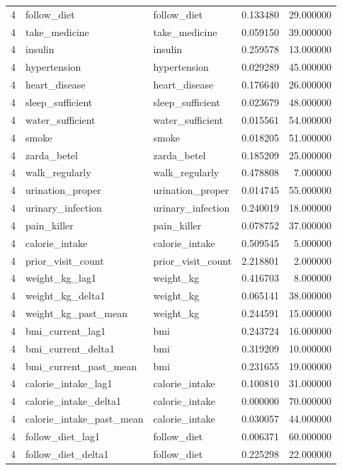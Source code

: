 \begin{longtable}{rllrr}
4 & follow\_diet & follow\_diet & 0.133480 & 29.000000 \\
4 & take\_medicine & take\_medicine & 0.059150 & 39.000000 \\
4 & insulin & insulin & 0.259578 & 13.000000 \\
4 & hypertension & hypertension & 0.029289 & 45.000000 \\
4 & heart\_disease & heart\_disease & 0.176640 & 26.000000 \\
4 & sleep\_sufficient & sleep\_sufficient & 0.023679 & 48.000000 \\
4 & water\_sufficient & water\_sufficient & 0.015561 & 54.000000 \\
4 & smoke & smoke & 0.018205 & 51.000000 \\
4 & zarda\_betel & zarda\_betel & 0.185209 & 25.000000 \\
4 & walk\_regularly & walk\_regularly & 0.478808 & 7.000000 \\
4 & urination\_proper & urination\_proper & 0.014745 & 55.000000 \\
4 & urinary\_infection & urinary\_infection & 0.240019 & 18.000000 \\
4 & pain\_killer & pain\_killer & 0.078752 & 37.000000 \\
4 & calorie\_intake & calorie\_intake & 0.509545 & 5.000000 \\
4 & prior\_visit\_count & prior\_visit\_count & 2.218801 & 2.000000 \\
4 & weight\_kg\_lag1 & weight\_kg & 0.416703 & 8.000000 \\
4 & weight\_kg\_delta1 & weight\_kg & 0.065141 & 38.000000 \\
4 & weight\_kg\_past\_mean & weight\_kg & 0.244591 & 15.000000 \\
4 & bmi\_current\_lag1 & bmi & 0.243724 & 16.000000 \\
4 & bmi\_current\_delta1 & bmi & 0.319209 & 10.000000 \\
4 & bmi\_current\_past\_mean & bmi & 0.231655 & 19.000000 \\
4 & calorie\_intake\_lag1 & calorie\_intake & 0.100810 & 31.000000 \\
4 & calorie\_intake\_delta1 & calorie\_intake & 0.000000 & 70.000000 \\
4 & calorie\_intake\_past\_mean & calorie\_intake & 0.030057 & 44.000000 \\
4 & follow\_diet\_lag1 & follow\_diet & 0.006371 & 60.000000 \\
4 & follow\_diet\_delta1 & follow\_diet & 0.225298 & 22.000000 \\

\end{longtable}
